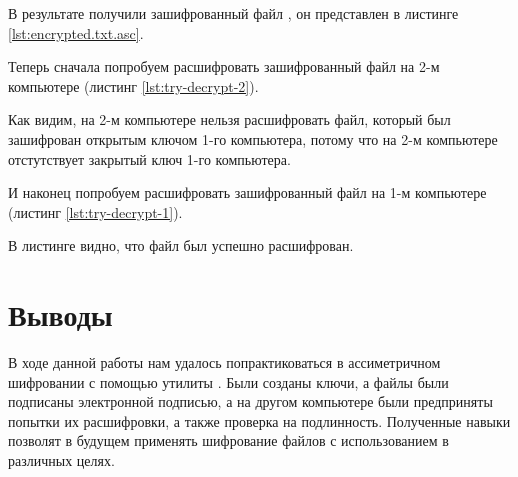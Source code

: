 

В результате получили зашифрованный файл , он представлен в листинге \ref{lst:encrypted.txt.asc}.



Теперь сначала попробуем расшифровать зашифрованный файл на 2-м компьютере (листинг \ref{lst:try-decrypt-2}).



Как видим, на 2-м компьютере нельзя расшифровать файл, который был зашифрован открытым ключом 1-го компьютера, потому что на 2-м компьютере отстутствует закрытый ключ 1-го компьютера.

И наконец попробуем расшифровать зашифрованный файл на 1-м компьютере (листинг \ref{lst:try-decrypt-1}).



В листинге видно, что файл был успешно расшифрован.


\section{Выводы}

В ходе данной работы нам удалось попрактиковаться в ассиметричном шифровании с помощью утилиты . Были созданы  ключи, а файлы были подписаны электронной подписью, а на другом компьютере были предприняты попытки их расшифровки, а также проверка на подлинность. 
Полученные навыки позволят в будущем применять шифрование файлов с использованием  в различных целях.



